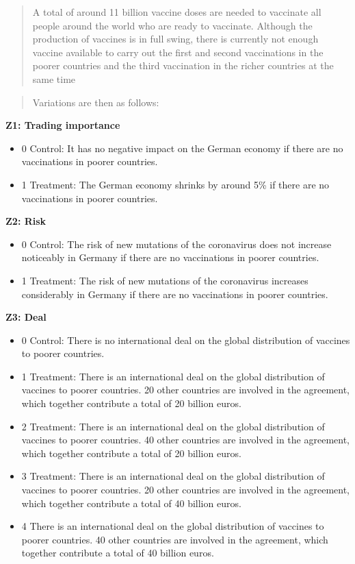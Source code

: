 \documentclass[12pt,oneside]{article}
\begin{document}
\begin{quote}
	A total of around 11 billion vaccine doses are needed to vaccinate all
	people around the world who are ready to vaccinate. Although the
	production of vaccines is in full swing, there is currently not enough
	vaccine available to carry out the first and second vaccinations in the
	poorer countries and the third vaccination in the richer countries at
	the same time
\end{quote}

\begin{quote}
	Variations are then as follows:
\end{quote}

\textbf{Z1: Trading importance}

\begin{itemize}
	\item
	0 Control: It has no negative impact on the German economy if there
	are no vaccinations in poorer countries.
	\item
	1 Treatment: The German economy shrinks by around 5\% if there are no
	vaccinations in poorer countries.
\end{itemize}

\textbf{Z2: Risk}

\begin{itemize}
	\item
	0 Control: The risk of new mutations of the coronavirus does not
	increase noticeably in Germany if there are no vaccinations in poorer
	countries.
	\item
	1 Treatment: The risk of new mutations of the coronavirus increases
	considerably in Germany if there are no vaccinations in poorer
	countries.
\end{itemize}

\textbf{Z3: Deal}

\begin{itemize}
	\item
	0 Control: There is no international deal on the global distribution
	of vaccines to poorer countries.
	\item
	1 Treatment: There is an international deal on the global distribution
	of vaccines to poorer countries. 20 other countries are involved in
	the agreement, which together contribute a total of 20 billion euros.
	\item
	2 Treatment: There is an international deal on the global distribution
	of vaccines to poorer countries. 40 other countries are involved in
	the agreement, which together contribute a total of 20 billion euros.
	\item
	3 Treatment: There is an international deal on the global distribution
	of vaccines to poorer countries. 20 other countries are involved in
	the agreement, which together contribute a total of 40 billion euros.
	\item
	4 There is an international deal on the global distribution of
	vaccines to poorer countries. 40 other countries are involved in the
	agreement, which together contribute a total of 40 billion euros.
\end{itemize}
\end{document}
